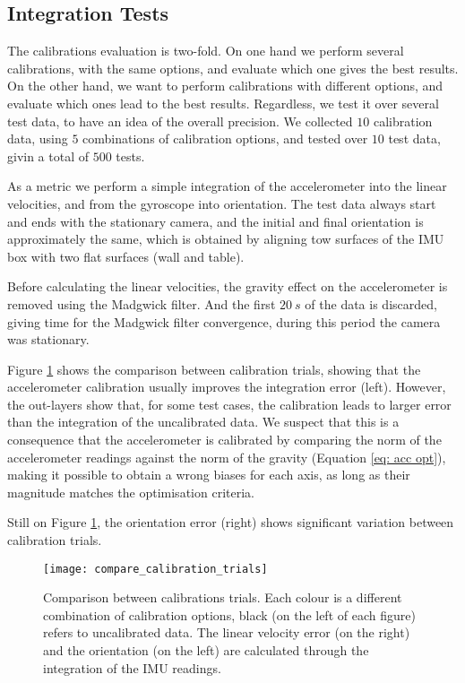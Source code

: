 \subsection{Integration Tests}\label{subsec: integration tests}

The calibrations evaluation is two-fold. 
%
On one hand we perform several calibrations, with the same options, and evaluate which one gives the best results.
%
On the other hand, we want to perform calibrations with different options, and evaluate which ones lead to the best results.
%
Regardless, we test it over several test data, to have an idea of the overall precision.
%
We collected $10$ calibration data, using $5$ combinations of calibration options, and tested over $10$ test data, givin a total of $500$ tests.

As a metric we perform a simple integration of the accelerometer into the linear velocities, and from the gyroscope into orientation.
%
The test data always start and ends with the stationary camera, and the initial and final orientation is approximately the same, which is obtained by aligning tow surfaces of the IMU box with two flat surfaces (wall and table).

Before calculating the linear velocities, the gravity effect on the accelerometer is removed using the Madgwick filter. 
%
And the first $20~s$ of the  data is discarded, giving time for the Madgwick filter convergence, during this period the camera was stationary.

Figure \ref{fig:comparecalibrationtrials} shows the comparison between calibration trials, showing that the accelerometer calibration usually improves the integration error (left). 
%
However, the out-layers show that, for some test cases, the calibration leads to larger error than the integration of the uncalibrated data.
%
We suspect that this is a consequence that the accelerometer is calibrated by comparing the norm of the accelerometer readings against the norm of the gravity (Equation \ref{eq: acc opt}), making it possible to obtain a wrong biases for each axis, as long as their magnitude matches the optimisation criteria.

Still on Figure \ref{fig:comparecalibrationtrials}, the orientation error (right) shows significant variation between calibration trials.

\begin{figure}[h]
	\centering
	\texttt{[image: compare\_calibration\_trials]}
	\caption{Comparison between calibrations trials. Each colour is a different combination of calibration options, black (on the left of each figure) refers to uncalibrated data. The linear velocity error (on the right) and the orientation (on the left) are calculated through the integration of the IMU readings.}
	\label{fig:comparecalibrationtrials}
\end{figure}

